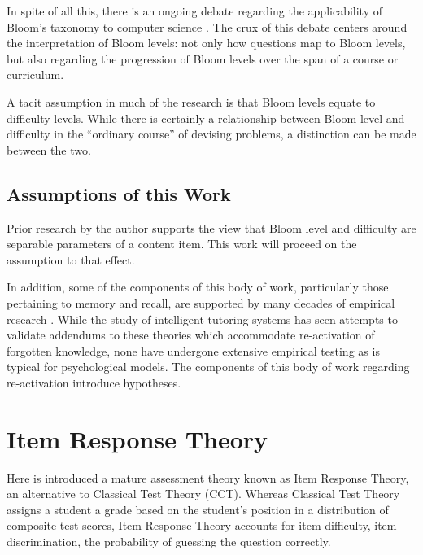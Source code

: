 In spite of all this, there is an ongoing debate regarding the applicability of
Bloom's taxonomy to computer science \cite{johnson2006bloom,
fuller2007developing, thompson2008bloom}.  The crux of this debate centers
around the interpretation of Bloom levels: not only how questions map to Bloom
levels, but also regarding the progression of Bloom levels over the span of a
course or curriculum.  

A tacit assumption in much of the research is that Bloom levels equate to
difficulty levels.  While there is certainly a relationship between Bloom level
and difficulty in the ``ordinary course'' of devising problems, a distinction
can be made between the two.

\subsection{Assumptions of this Work}

Prior research by the author supports the view that Bloom level and difficulty
are separable parameters of a content item.  This work will proceed on the
assumption to that effect. 

In addition, some of the components of this body of work, particularly those
pertaining to memory and recall, are supported by many decades of empirical
research \cite{ebbinghaus}.  While the study of intelligent tutoring systems
has seen attempts to validate addendums to these theories which accommodate
re-activation of forgotten knowledge, none have undergone extensive empirical
testing as is typical for psychological models.  The components of this body of
work regarding re-activation introduce hypotheses.


\section{Item Response Theory}

Here is introduced a mature assessment theory known as Item Response Theory, an
alternative to Classical Test Theory (CCT).  Whereas Classical Test Theory
assigns a student a grade based on the student's position in a distribution of
composite test scores, Item Response Theory accounts for item difficulty, item
discrimination, the probability of guessing the question correctly.

